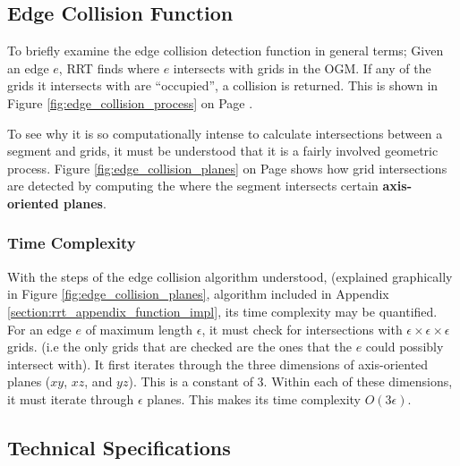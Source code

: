 \subsection{Edge Collision Function}
\label{subsection:EdgeCollisionFunction}
    To briefly examine the edge collision detection function in general terms; Given an edge $e$, \gls{RRT} finds where $e$ intersects with grids in the \gls{OGM}. If any of the grids it intersects with are ``occupied'', a collision is returned. This is shown in Figure \ref{fig:edge_collision_process} on Page \pageref{fig:edge_collision_process}. 

    To see why it is so computationally intense to calculate intersections between a segment and grids, it must be understood that it is a fairly involved geometric process. Figure \ref{fig:edge_collision_planes} on Page \pageref{fig:edge_collision_planes} shows how grid intersections are detected by computing the where the segment intersects certain \textbf{\glspl{axis-oriented plane}}.  

    \subsubsection{Time Complexity}
        With the steps of the edge collision algorithm understood, (explained graphically in Figure \ref{fig:edge_collision_planes}, algorithm included in Appendix \ref{section:rrt_appendix_function_impl}, its \Gls{time complexity} may be quantified. 
        For an edge $e$ of maximum length $\epsilon$, it must check for intersections with $\epsilon \times \epsilon \times \epsilon$ grids. (i.e the only grids that are checked are the ones that the $e$ could possibly intersect with). 
        It first iterates through the three dimensions of \glspl{axis-oriented plane} ($xy$, $xz$, and $yz$). This is a constant of 3. 
        Within each of these dimensions, it must iterate through $\epsilon$ planes. This makes its time complexity $O(3\epsilon)$. 

        

        
   
\subsection{Technical Specifications}
\label{subsection:HoneyBeeSpecs}

